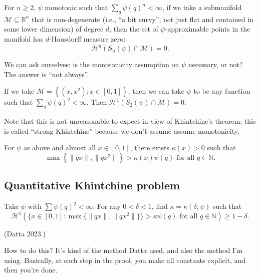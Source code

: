 \documentclass[reqno]{amsart} 
\numberwithin{theorem}{section}
\numberwithin{equation}{section}
\begin{document}
\begin{theorem}
  For $n \geq 2$, $\psi$ monotonic such that $\sum_q \psi(q)^n < \infty$, if we take a submanifold $\mathcal{M} \subseteq \mathbb{R}^n$ that is non-degenerate (i.e., ``a bit curvy'', not just flat and contained in some lower dimension) of degree $d$, then the set of $\psi$-approximable points in the manifold has $d$-Hausdorff measure zero:
  \begin{equation*}
    \mathcal{H}^d \left( S_n(\psi) \cap \mathcal{M} \right) = 0.
  \end{equation*}
\end{theorem}
We can ask ourselves: is the monotonicity assumption on $\psi$ necessary, or not?  The answer is ``not always''.
\begin{theorem}[Huang, 2019]
  If we take $\mathcal{M} = \left\{(x, x^2) : x \in[0, 1] \right\}$, then we can take $\psi$ to be any function such that $\sum_q \psi(q)^2 < \infty$.  Then $\mathcal{H}^1(S_2(\psi) \cap \mathcal{M}) = 0$.
\end{theorem}
Note that this is not unreasonable to expect in view of Khintchine's theorem; this is called ``strong Khintchine'' because we don't assume assume monotonicity.

\begin{corollary}
  For $\psi$ as above and almost all $x \in[0, 1]$, there exists $\kappa(x) > 0$ such that
  \begin{equation*}
    \max \left\{ \lVert q x \rVert, \lVert q x^2 \rVert \right\} > \kappa(x) \psi(q) \text{ for all } q \in \mathbb{N}.
  \end{equation*}
\end{corollary}

\subsection{Quantitative Khintchine problem}

Take $\psi$ with $\sum \psi(q)^2 < \infty$.  For any $0 < \delta < 1$, find $\kappa = \kappa(\delta, \psi)$ such that
\begin{equation*}
  \mathcal{H}^1 \left( \{x \in[0, 1] : \max \{\lVert q x \rVert, \lVert q x^2 \rVert\}\} > \kappa \psi(q) \text{ for all } q \in \mathbb{N} \right) \geq 1 - \delta.
\end{equation*}

(Datta 2023.)

How to do this?  It's kind of the method Datta used, and also the method I'm using.  Basically, at each step in the proof, you make all constants explicit, and then you're done.
\end{document}

